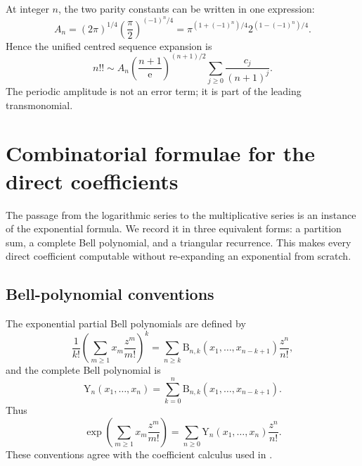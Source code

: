 \documentclass[11pt,a4paper,oneside]{article}
\theoremstyle{plain}
\theoremstyle{definition}
\theoremstyle{remark}
\newcommand{\e}{\mathrm e}
\newcommand{\BellP}[2]{\mathrm B_{#1,#2}}
\newcommand{\BellC}[1]{\mathrm Y_{#1}}
\begin{document}
At integer $n$, the two parity constants can be written in one expression:
\begin{equation}
 A_n=(2\pi)^{1/4}\left(\frac\pi2\right)^{(-1)^n/4}
 =\pi^{(1+(-1)^n)/4}2^{(1-(-1)^n)/4}.
 \label{eq:parity-amplitude}
\end{equation}
Hence the unified centred sequence expansion is
\begin{equation}
 n!!\sim A_n\left(\frac{n+1}{\e}\right)^{(n+1)/2}
 \sum_{j\ge0}\frac{c_j}{(n+1)^j}.
 \label{eq:sequence-centered-unified}
\end{equation}
The periodic amplitude is not an error term; it is part of the leading
transmonomial.

\section{Combinatorial formulae for the direct coefficients}
\label{sec:direct-coefficients}

The passage from the logarithmic series to the multiplicative series is an
instance of the exponential formula.  We record it in three equivalent forms:
a partition sum, a complete Bell polynomial, and a triangular recurrence.
This makes every direct coefficient computable without re-expanding an
exponential from scratch.

\subsection{Bell-polynomial conventions}

The exponential partial Bell polynomials are defined by
\begin{equation}
 \frac1{k!}\left(\sum_{m\ge1}x_m\frac{z^m}{m!}\right)^k
 =\sum_{n\ge k}\BellP{n}{k}(x_1,\ldots,x_{n-k+1})\frac{z^n}{n!},
 \label{eq:partial-bell-def}
\end{equation}
and the complete Bell polynomial is
\begin{equation}
 \BellC{n}(x_1,\ldots,x_n)
 =\sum_{k=0}^n\BellP{n}{k}(x_1,\ldots,x_{n-k+1}).
 \label{eq:complete-bell-def}
\end{equation}
Thus
\begin{equation}
 \exp\!\left(\sum_{m\ge1}x_m\frac{z^m}{m!}\right)
 =\sum_{n\ge0}\BellC{n}(x_1,\ldots,x_n)\frac{z^n}{n!}.
 \label{eq:bell-exponential}
\end{equation}
These conventions agree with the coefficient calculus used in
\cite{ProveItCCC,Comtet}.
\end{document}
